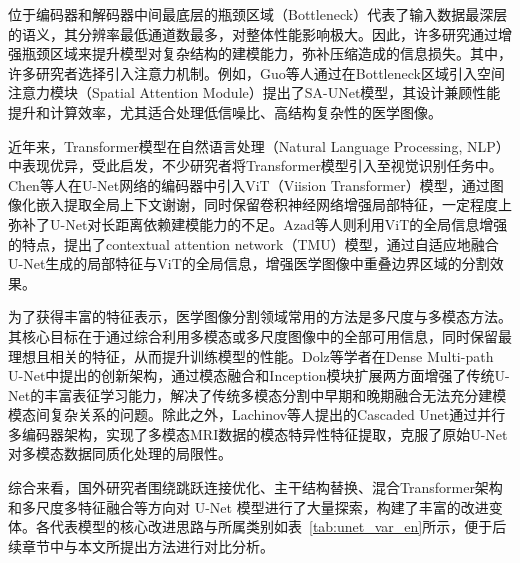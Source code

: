 位于编码器和解码器中间最底层的瓶颈区域（Bottleneck）代表了输入数据最深层的语义，其分辨率最低通道数最多，对整体性能影响极大。因此，许多研究通过增强瓶颈区域来提升模型对复杂结构的建模能力，弥补压缩造成的信息损失。其中，许多研究者选择引入注意力机制。例如，Guo等人\cite{guo2021}通过在Bottleneck区域引入空间注意力模块（Spatial Attention Module）提出了SA-UNet模型，其设计兼顾性能提升和计算效率，尤其适合处理低信噪比、高结构复杂性的医学图像。

近年来，Transformer模型在自然语言处理（Natural Language Processing, NLP）中表现优异，受此启发，不少研究者将Transformer模型引入至视觉识别任务中。Chen等人\cite{chen2021}在U-Net网络的编码器中引入ViT（Viision Transformer）模型，通过图像化嵌入提取全局上下文谢谢，同时保留卷积神经网络增强局部特征，一定程度上弥补了U-Net对长距离依赖建模能力的不足。Azad等人\cite{azad2022}则利用ViT的全局信息增强的特点，提出了contextual attention network（TMU）模型，通过自适应地融合U-Net生成的局部特征与ViT的全局信息，增强医学图像中重叠边界区域的分割效果。

为了获得丰富的特征表示，医学图像分割领域常用的方法是多尺度与多模态方法。其核心目标在于通过综合利用多模态或多尺度图像中的全部可用信息，同时保留最理想且相关的特征，从而提升训练模型的性能。Dolz\cite{dolz2018}等学者在Dense Multi-path U-Net中提出的创新架构，通过模态融合和Inception模块扩展两方面增强了传统U-Net的丰富表征学习能力，解决了传统多模态分割中早期和晚期融合无法充分建模模态间复杂关系的问题。除此之外，Lachinov等人\cite{lachinov2019}提出的Cascaded Unet通过并行多编码器架构，实现了多模态MRI数据的模态特异性特征提取，克服了原始U-Net对多模态数据同质化处理的局限性。

综合来看，国外研究者围绕跳跃连接优化、主干结构替换、混合Transformer架构和多尺度多特征融合等方向对 U-Net 模型进行了大量探索，构建了丰富的改进变体。各代表模型的核心改进思路与所属类别如表~\ref{tab:unet_var_en}所示，便于后续章节中与本文所提出方法进行对比分析。

